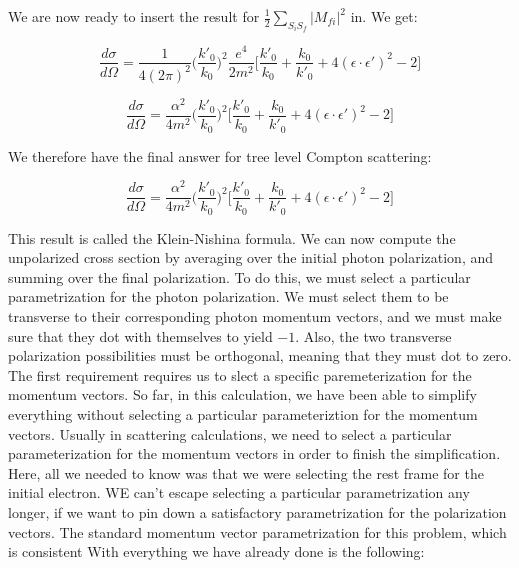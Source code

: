 \documentclass[a4]{article}
\begin{document}
    We are now ready to insert the result for $\frac{1}{2} \sum_{S_i S_f} |M_{fi}|^2$ in. We get:

    \begin{equation}
        \frac{d \sigma}{d \Omega} = \frac{1}{4 (2 \pi)^2} \bigg( \frac{k'_0}{k_0} \bigg)^2 \frac{e^4}{2m^2} \Bigg[ \frac{k'_{0}}{k_{0}}
        + \frac{k_{0}}{k'_{0}} + 4 (\epsilon \cdot \epsilon')^2 - 2 \Bigg]
    \end{equation}

    \begin{equation}
        \frac{d \sigma}{d \Omega} = \frac{\alpha^2}{4 m^2} \bigg( \frac{k'_0}{k_0} \bigg)^2 \Bigg[ \frac{k'_{0}}{k_{0}}
        + \frac{k_{0}}{k'_{0}} + 4 (\epsilon \cdot \epsilon')^2 - 2 \Bigg]
    \end{equation}

    We therefore have the final answer for tree level Compton scattering:

    \begin{framed}
        \begin{equation}
            \frac{d \sigma}{d \Omega} = \frac{\alpha^2}{4 m^2} \bigg( \frac{k'_0}{k_0} \bigg)^2 \Bigg[ \frac{k'_{0}}{k_{0}}
            + \frac{k_{0}}{k'_{0}} + 4 (\epsilon \cdot \epsilon')^2 - 2 \Bigg]
        \end{equation}
    \end{framed}

    This result is called the Klein-Nishina formula. We can now compute the unpolarized cross section by averaging over the initial photon polarization, and summing over the final polarization. To do this, we must
    select a particular parametrization for the photon polarization. We must select them to be transverse to their corresponding photon momentum vectors, and we must make sure that they dot with themselves to yield
    $-1$. Also, the two transverse polarization possibilities must be orthogonal, meaning that they must dot to zero. The first requirement requires us to slect a specific paremeterization for the momentum vectors.
    So far, in this calculation, we have been able to simplify everything without selecting a particular parameteriztion for the momentum vectors. Usually in scattering calculations, we need to select a particular
    parameterization for the momentum vectors in order to finish the simplification. Here, all we needed to know was that we were selecting the rest frame for the initial electron. WE can't escape selecting a
    particular parametrization any longer, if we want to pin down a satisfactory parametrization for the polarization vectors. The standard momentum vector parametrization for this problem, which is consistent With
    everything we have already done is the following:
\end{document}
